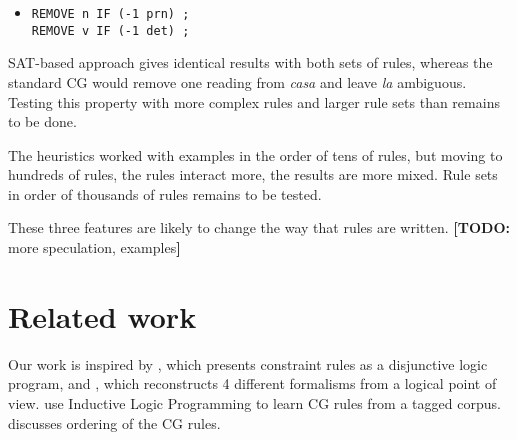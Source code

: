 \documentclass[11pt]{article}
\newcommand{\todo}[1]{{\color{cyan}\textbf{[TODO: }#1\textbf{]}}}
\begin{document}
\begin{itemize}
\item [] \texttt{REMOVE n IF (-1 prn) ;} \\
             \texttt{REMOVE v IF (-1 det) ;}
\end{itemize}

SAT-based approach gives identical results with both sets of rules,
whereas the standard CG would remove one reading from \emph{casa} and leave \emph{la} ambiguous.
Testing this property with more complex rules and larger rule sets than remains to be done.


The heuristics worked with examples in the order of tens of rules, but moving to hundreds of rules, the rules interact more, the results are more mixed. 
Rule sets in order of thousands of rules remains to be tested.


These three features are likely to change the way that rules are written. \todo{more speculation, examples}


\section{Related work}
\label{sect:related}

Our work is inspired by \cite{lager98}, which presents constraint rules as a disjunctive logic program,
and \cite{lager_nivre01}, which reconstructs 4 different formalisms from a logical point of view.
\cite{lindberg_eineborg98ilp,asfrent14} use Inductive Logic Programming to learn CG rules from a tagged corpus.
\cite{lager01transformation} discusses ordering of the CG rules.
\end{document}
